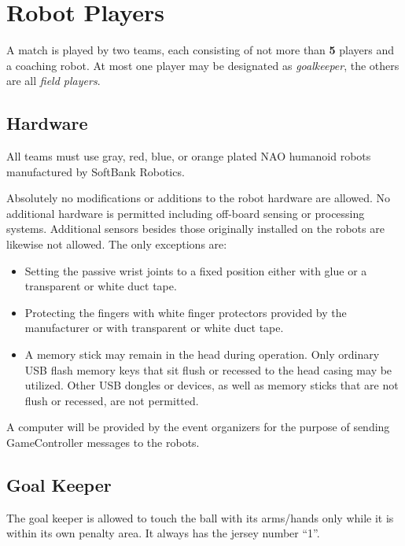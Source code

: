 \documentclass[12pt]{article}
\begin{document}
\newpage


\section{Robot Players}
\label{sec:robot_players}
A match is played by two teams, each consisting of not more than \textbf{5} players and a coaching robot. At most one player may be designated as \emph{goalkeeper}, the others are all \emph{field players}.

\subsection{Hardware}
\label{sec:hardware}
All teams must use gray, red, blue, or orange plated NAO humanoid robots manufactured by SoftBank Robotics. 

Absolutely no modifications or additions to the robot hardware are allowed. No additional hardware is permitted including off-board sensing or processing systems. Additional sensors besides those originally installed on the robots are likewise not allowed. The only exceptions are:

\begin{itemize}

\item Setting the passive wrist joints to a fixed position either with glue or a transparent or white duct tape.

\item Protecting the fingers with white finger protectors provided by the manufacturer or with transparent or white duct tape.

\item A memory stick may remain in the head during operation.  Only ordinary USB flash memory keys that sit flush or recessed to the head casing may be utilized. Other USB dongles or devices, as well as memory sticks that are not flush or recessed, are not permitted.

\end{itemize}

A computer will be provided by the event organizers for the purpose of sending GameController messages to the robots.

\subsection{Goal Keeper}
\label{sec:goal_keeper}

The goal keeper is allowed to touch the ball with its arms/hands only while it is within its own penalty area. It always has the jersey number ``1''.
\end{document}
